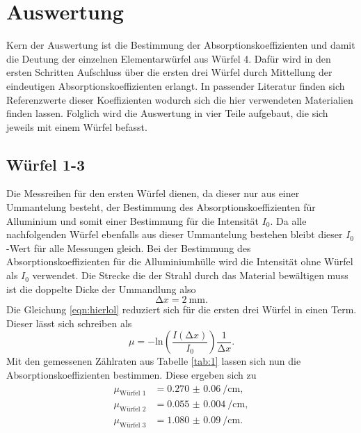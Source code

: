 \section{Auswertung}
Kern der Auswertung ist die Bestimmung der Absorptionskoeffizienten und damit die Deutung der einzelnen Elementarwürfel aus Würfel 4.
Dafür wird in den ersten Schritten Aufschluss über die ersten drei Würfel durch Mittellung der eindeutigen Absorptionskoeffizienten erlangt. 
In passender Literatur \cite{wqs} finden sich Referenzwerte dieser Koeffizienten wodurch sich die hier verwendeten Materialien finden lassen.  
Folglich wird die Auswertung in vier Teile aufgebaut, die sich jeweils mit einem Würfel befasst. 

\subsection{Würfel 1-3}
Die Messreihen für den ersten Würfel dienen, da dieser nur aus einer Ummantelung besteht, der Bestimmung des Absorptionskoeffizienten für Alluminium und somit einer Bestimmung 
für die Intensität $I_0$. Da alle nachfolgenden Würfel ebenfalls aus dieser Ummantelung bestehen bleibt dieser $I_0$-Wert für alle Messungen gleich. Bei der Bestimmung des Absorptionskoeffizienten für die Alluminiumhülle
wird die Intensität ohne Würfel als $I_0$ verwendet. 
Die Strecke die der Strahl durch das Material bewältigen muss ist die doppelte Dicke der Ummandlung also
\begin{equation*}
    \increment x = \SI{2}{\milli\meter}.
\end{equation*}
Die Gleichung \eqref{eqn:hierlol} reduziert sich für die ersten drei Würfel in einen Term. Dieser lässt sich schreiben als
\begin{equation*}
\mu = - \text{ln} \left( \frac{I(\increment x)}{I_0} \right) \frac{1}{\increment x}.
\end{equation*}
Mit den gemessenen Zählraten aus Tabelle \ref{tab:1} lassen sich nun die Absorptionskoeffizienten bestimmen. Diese ergeben sich zu
\begin{align*}
\mu_{\text{Würfel 1}} &= \SI{0.270(60)}{\per\centi\meter},\\
\mu_{\text{Würfel 2}} &= \SI{0.055(4)}{\per\centi\meter},\\
\mu_{\text{Würfel 3}} &= \SI{1.080(90)}{\per\centi\meter}. 
\end{align*}
